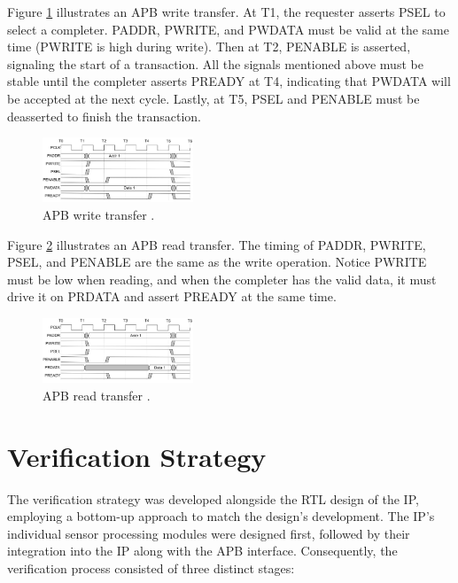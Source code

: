 \documentclass[conference]{IEEEtran}
\begin{document}
Figure \ref{fig:apb_write} illustrates an APB write transfer. At T1, the requester asserts PSEL to select a completer. PADDR, PWRITE, and PWDATA must be valid at the same time (PWRITE is high during write). Then at T2, PENABLE is asserted, signaling the start of a transaction. All the signals mentioned above must be stable until the completer asserts PREADY at T4, indicating that PWDATA will be accepted at the next cycle. Lastly, at T5, PSEL and PENABLE must be deasserted to finish the transaction.

\begin{figure}[h!]
    \centering
    \includegraphics[width = 0.4\textwidth]{figures/apb_write.png}
    \caption{APB write transfer \cite{APB}.}
    \label{fig:apb_write}
\end{figure}

Figure \ref{fig:apb_read} illustrates an APB read transfer. The timing of PADDR, PWRITE, PSEL, and PENABLE are the same as the write operation. Notice PWRITE must be low when reading, and when the completer has the valid data, it must drive it on PRDATA and assert PREADY at the same time.

\begin{figure}[h!]
    \centering
    \includegraphics[width = 0.4\textwidth]{figures/apb_read.png}
    \caption{APB read transfer \cite{APB}.}
    \label{fig:apb_read}
\end{figure}

\section{Verification Strategy}
The verification strategy was developed alongside the RTL design of the IP, employing a bottom-up approach to match the design's development. The IP's individual sensor processing modules were designed first, followed by their integration into the IP along with the APB interface. Consequently, the verification process consisted of three distinct stages:
\end{document}
